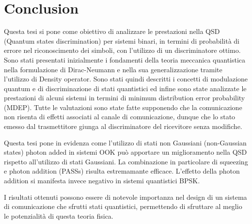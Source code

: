
\chapter{Conclusion}
    Questa tesi si pone come obiettivo di analizzare le prestazioni nella QSD (Quantum states discrimination) per 
    sistemi binari, in termini di probabilità di errore nel riconoscimento dei simboli, con l'utilizzo di un discriminatore ottimo.
    Sono stati presentati inizialmente i fondamenti della teoria meccanica quantistica nella formulazione di 
    Dirac-Neumann e nella sua generalizzazione tramite l'utilizzo di Density operator. Sono stati quindi descritti
    i concetti di modulazione quantum e di discriminazione di stati quantistici ed infine sono state analizzate le
    prestazioni di alcuni sistemi in termini di minimum distribution error probability (MDEP). 
    Tutte le valutazioni sono state fatte supponendo che la comunicazione non risenta di effetti associati al canale di comunicazione,
    dunque che lo stato emesso dal trasmettitore giunga al discriminatore del ricevitore senza modifiche.

    Questa tesi pone in evidenza come l'utilizzo di stati non Gaussiani (non-Gaussian states) photon added in sistemi OOK può 
    apportare un miglioramento nella QSD rispetto all'utilizzo di stati Gaussiani. La combinazione in particolare di squeezing 
    e photon addition (PASSs) risulta estremamante efficace.
    L'effetto della photon addition si manifesta invece negativo in sistemi quantistici BPSK.

    I risultati ottenuti possono essere di notevole importanza nel design di un sistema di comunicazione che sfrutti stati 
    quantistici, permettendo di sfruttare al meglio le potenzialità di questa teoria fisica.